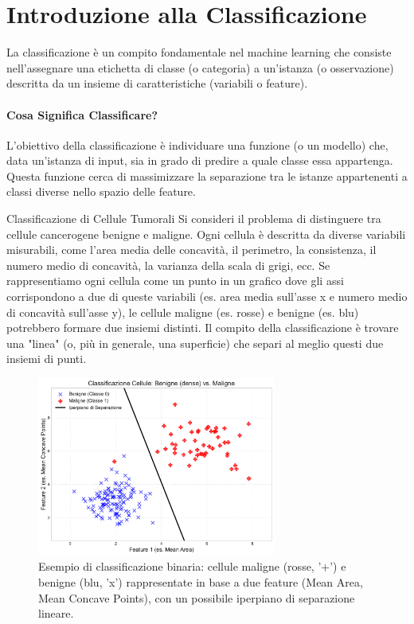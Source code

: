 \documentclass{article}
\begin{document}
\section{Introduzione alla Classificazione}

La classificazione è un compito fondamentale nel machine learning che consiste nell'assegnare una etichetta di classe (o categoria) a un'istanza (o osservazione) descritta da un insieme di caratteristiche (variabili o feature).

\paragraph{Cosa Significa Classificare?}L'obiettivo della classificazione è individuare una funzione (o un modello) che, data un'istanza di input, sia in grado di predire a quale classe essa appartenga. Questa funzione cerca di massimizzare la separazione tra le istanze appartenenti a classi diverse nello spazio delle feature.

\begin{examplebox}{Classificazione di Cellule Tumorali}
    Si consideri il problema di distinguere tra cellule cancerogene benigne e maligne.  Ogni cellula è descritta da diverse variabili misurabili, come l'area media delle concavità, il perimetro, la consistenza, il numero medio di concavità, la varianza della scala di grigi, ecc.
    Se rappresentiamo ogni cellula come un punto in un grafico dove gli assi corrispondono a due di queste variabili (es. area media sull'asse x e numero medio di concavità sull'asse y), le cellule maligne (es. rosse) e benigne (es. blu) potrebbero formare due insiemi distinti.  Il compito della classificazione è trovare una "linea" (o, più in generale, una superficie) che separi al meglio questi due insiemi di punti.
\end{examplebox}

\begin{figure}[H]
    \centering
    \includegraphics[width=0.7\textwidth]{images/cell_classification_scatter.pdf}
    \caption{Esempio di classificazione binaria: cellule maligne (rosse, '+') e benigne (blu, 'x') rappresentate in base a due feature (Mean Area, Mean Concave Points), con un possibile iperpiano di separazione lineare.}
    \label{fig:cell_classification_scatter}
\end{figure}
\end{document}
